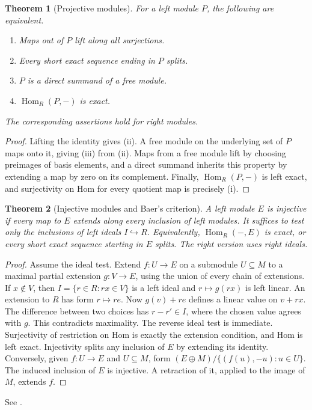 \documentclass[11pt,oneside,openany]{book}
\newtheorem{theorem}{Theorem}[chapter]
\theoremstyle{definition}
\theoremstyle{remark}
\begin{document}
\begin{theorem}[Projective modules]\label{p103:ALG-03-C02-R02}
For a left module \(P\), the following are equivalent.
\begin{enumerate}[label=(\roman*)]
\item Maps out of \(P\) lift along all surjections.
\item Every short exact sequence ending in \(P\) splits.
\item \(P\) is a direct summand of a free module.
\item \(\operatorname{Hom}_R(P,-)\) is exact.
\end{enumerate}
The corresponding assertions hold for right modules.
\end{theorem}
\begin{proof}
Lifting the identity gives (ii). A free module on the underlying
set of \(P\) maps onto it, giving (iii) from (ii). Maps from a free
module lift by choosing preimages of basis elements, and a direct
summand inherits this property by extending a map by zero on its
complement. Finally, \(\operatorname{Hom}_R(P,-)\) is left exact,
and surjectivity on Hom for every quotient map is precisely (i).
\end{proof}

\begin{theorem}[Injective modules and Baer's criterion]
\label{p103:ALG-03-C02-R03}
A left module \(E\) is injective if every map to \(E\) extends along
every inclusion of left modules. It suffices to test only the
inclusions of left ideals \(I\hookrightarrow R\).
Equivalently, \(\operatorname{Hom}_R(-,E)\) is exact, or every short
exact sequence starting in \(E\) splits. The right version uses
right ideals.
\end{theorem}
\begin{proof}
Assume the ideal test. Extend \(f:U\to E\) on a submodule
\(U\subseteq M\) to a maximal partial extension \(g:V\to E\),
using the union of every chain of extensions. If \(x\notin V\),
then \(I=\{r\in R:rx\in V\}\) is a left ideal and \(r\mapsto
g(rx)\) is left linear. An extension to \(R\) has form
\(r\mapsto re\). Now \(g(v)+re\) defines a linear value on \(v+rx\).
The difference between two choices has \(r-r'\in I\), where the
chosen value agrees with \(g\). This contradicts maximality.
The reverse ideal test is immediate. Surjectivity of restriction
on Hom is exactly the extension condition, and Hom is left exact.
Injectivity splits any inclusion of \(E\) by extending its identity.
Conversely, given \(f:U\to E\) and \(U\subseteq M\), form
\((E\oplus M)/\{(f(u),-u):u\in U\}\). The induced inclusion of
\(E\) is injective. A retraction of it, applied to the image of
\(M\), extends \(f\).
\end{proof}
See \cite[Sections 2A--2B and Theorem 3.7]{lam}.
\end{document}

